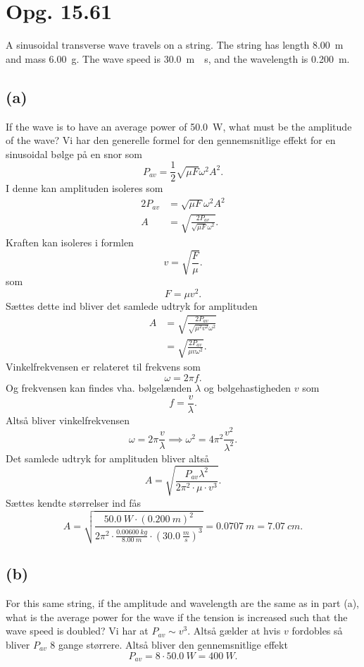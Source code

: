 \documentclass[12pt]{article}
\theoremstyle{definition}
\begin{document}
\section*{Opg. 15.61}
A sinusoidal transverse wave travels on a string. The string has
length \qty{8,00}{m} and mass \qty{6,00}{g}. The wave speed is \qty{30,0}{m \per s}, and the wavelength is \qty{0,200}{m}.

\subsection*{(a)}
If the wave is to have an average power of \qty{50,0}{W}, what must be the amplitude of the wave?
\bigbreak
Vi har den generelle formel for den gennemsnitlige effekt for en sinusoidal bølge på en snor som
\[ 
P_{av} = \frac{1}{2}\sqrt{\mu F} \omega^2 A^2
.\]
I denne kan amplituden isoleres som
\begin{align*}
  2P_{av} &= \sqrt{\mu F} \omega^2 A^2 \\
  A &= \sqrt{\frac{2P_{av}}{\sqrt{\mu F}\omega^2}}
.\end{align*}
Kraften kan isoleres i formlen
\[ 
v = \sqrt{\frac{F}{\mu}}
.\]
som
\[ 
F = \mu v^2
.\]
Sættes dette ind bliver det samlede udtryk for amplituden
\begin{align*}
  A &= \sqrt{\frac{2P_{av}}{\sqrt{\mu^2 v^2} \omega^2}} \\
  &= \sqrt{\frac{2P_{av}}{\mu v \omega^2}}
.\end{align*}
Vinkelfrekvensen er relateret til frekvens som
\[ 
\omega = 2\pi f
.\]
Og frekvensen kan findes vha. bølgelænden $\lambda$ og bølgehastigheden $v$ som
\[ 
f = \frac{v}{\lambda}
.\]
Altså bliver vinkelfrekvensen
\[ 
\omega = 2\pi \frac{v}{\lambda} \implies \omega^2 = 4 \pi^2 \frac{v^2}{\lambda^2}
.\]
Det samlede udtryk for amplituden bliver altså
\[ 
A = \sqrt{\frac{P_{av} \lambda^2}{2\pi^2 \cdot \mu\cdot v^3}}
.\]
Sættes kendte størrelser ind fås
\[
  A = \sqrt{\frac{\qty{50,0}{W} \cdot (\qty{0,200}{m})^2}{2\pi^2 \cdot \frac{\qty{0,00600}{kg}}{\qty{8,00}{m}} \cdot \left( \qty{30,0}{\frac{m}{s}}  \right)^3}} =\qty{0,0707}{m} = \qty{7,07}{cm}  
.\]



\subsection*{(b)}
For this same string, if the amplitude and wavelength are the same as in part (a), what is the average power for the wave if the tension is increased such that the wave speed is doubled?
\bigbreak
Vi har at $P_{av} \sim v^3$. Altså gælder at hvis $v$ fordobles så bliver $P_{av}$ 8 gange størrere. Altså bliver den gennemsnitlige effekt
\[ 
P_{av} = 8\cdot \qty{50,0}{W} = \qty{400}{W} 
.\]
\end{document}
